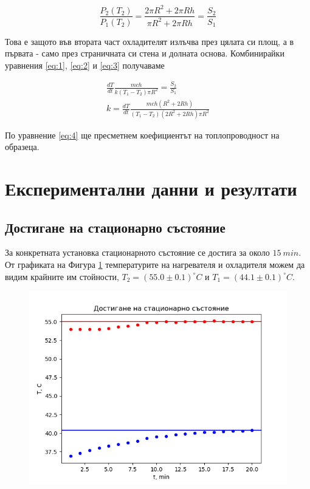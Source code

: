 \documentclass[reprint,amsmath,amssymb,aps,floatfix]{revtex4-2}
\newcommand{\degree}{^{\circ}}
\begin{document}
\begin{equation*} \label{eq:3}
    \frac{P_2(T_2)}{P_1(T_2)} = \frac{2\pi R^2 + 2\pi Rh}{\pi R^2 + 2\pi Rh} = \frac{S_2}{S_1} \tag{3}
\end{equation*}

Това е защото във втората част охладителят излъчва през цялата си площ, а в първата - само през страничната си стена и долната основа. Комбинирайки уравнения \eqref{eq:1}, \eqref{eq:2} и \eqref{eq:3} получаваме 

\begin{align*}
    \frac{dT}{dt} \frac{mc h}{k (T_1 - T_2) \pi R^2} = \frac{S_2}{S_1} \\
    k = \frac{dT}{dt} \frac{mc h ( R^2 + 2 Rh)}{(T_1 - T_2) (2 R^2 + 2 Rh) \pi R^2} \label{eq:4} \tag{4}
\end{align*}

По уравнение \eqref{eq:4} ще пресметнем коефициентът на топлопроводност на образеца. 

\section{Експериментални данни и резултати}
\subsection{Достигане на стационарно състояние}

За конкретната установка стационарното състояние се достига за около $15 \ \si{min}$. От графиката на Фигура \ref{fig:1} температурите на нагревателя и охладителя можем да видим крайните им стойности, $T_2 = (55.0 \pm 0.1) \degree C$ и $T_1 = (44.1 \pm 0.1) \degree C$. 

\begin{figure}[ht] 
    \centering
    \includegraphics[width=\columnwidth, keepaspectratio=true]{graph_statz.png}
    \caption{}
    \label{fig:1}
\end{figure}
\end{document}
